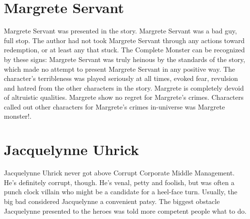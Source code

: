 \documentclass[12pt]{book}
\begin{document}
\chapter{Margrete Servant}
Margrete Servant was presented in the story. Margrete Servant was a bad guy, full stop. The author had not took Margrete Servant through any actions toward redemption, or at least any that stuck. The Complete Monster can be recognized by these signs: Margrete Servant was truly heinous by the standards of the story, which made no attempt to present Margrete Servant in any positive way. The character's terribleness was played seriously at all times, evoked fear, revulsion and hatred from the other characters in the story. Margrete is completely devoid of altruistic qualities. Margrete show no regret for Margrete's crimes. Characters called out other characters for Margrete's crimes in-universe was Margrete monster!.

\chapter{Jacquelynne Uhrick}
Jacquelynne Uhrick never got above Corrupt Corporate Middle Management. He's definitely corrupt, though. He's venal, petty and foolish, but was often a punch clock villain who might be a candidate for a heel-face turn. Usually, the big bad considered Jacquelynne a convenient patsy. The biggest obstacle Jacquelynne presented to the heroes was told more competent people what to do.
\end{document}
